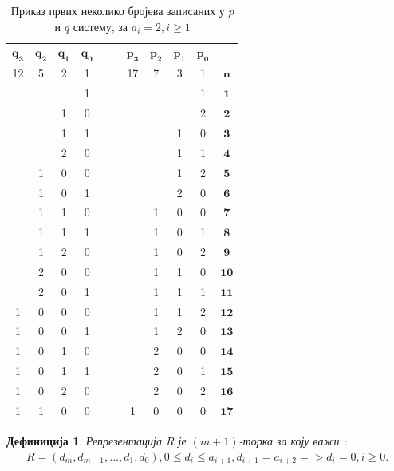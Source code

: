 \documentclass[a4paper]{article}
\newtheorem{definition}{Дефиниција}
\begin{document}
\begin{table}[h!]
	\caption{Приказ првих неколико бројева записаних у $ p $ и $ q $ систему, за $ a_{i} = 2 , i \ge 1 $}
	\label{tab:p_q_sistem}
	\begin{center}
		\begin{tabular}{ | c | c | c | c | c  c | c | c | c | c | c |}
			\hline
			{$ \mathbf{q_{3}} $} &  {$ \mathbf{q_{2}} $} &  {$ \mathbf{q_{1}} $} &  {$ \mathbf{q_{0}} $} & & &  {$ \mathbf{p_{3}} $} &  {$ \mathbf{p_{2}} $} &  {$ \mathbf{p_{1}} $} &  {$ \mathbf{p_{0}} $} &\\
			12 & 5 & 2 & 1 & & & 17 & 7 & 3 & 1 &  {$ \mathbf{n} $}\\
			\hline
			&  &  & 1 & & &  &  &  & 1 & {$ \mathbf{1} $}\\
			&  & 1 & 0 & & &  &  &  & 2 & {$ \mathbf{2} $}\\
			&  & 1 & 1 & & &  &  & 1 & 0 &  {$ \mathbf{3} $}\\
			&  & 2 & 0 & & &  &  & 1 & 1 &  {$ \mathbf{4} $}\\
			& 1 & 0 & 0 & & &  &  & 1 & 2 &  {$ \mathbf{5} $}\\
			& 1 & 0 & 1 & & &  &  & 2 & 0 &  {$ \mathbf{6} $}\\
			& 1 & 1 & 0 & & &  & 1 & 0 & 0 &  {$ \mathbf{7} $}\\
			& 1 & 1 & 1 & & &  & 1 & 0 & 1 &  {$ \mathbf{8} $}\\
			& 1 & 2 & 0 & & &  & 1 & 0 & 2 &  {$ \mathbf{9} $}\\
			& 2 & 0 & 0 & & &  & 1 & 1 & 0 &  {$ \mathbf{10} $}\\
			& 2 & 0 & 1 & & &  & 1 & 1 & 1 &  {$ \mathbf{11} $}\\
			 1 & 0 & 0 & 0 & & & & 1 & 1 & 2 &  {$ \mathbf{12} $}\\
			 1 & 0 & 0 & 1 & & & & 1 & 2 & 0 &  {$ \mathbf{13} $}\\
			 1 & 0 & 1 & 0 & & & & 2 & 0 & 0 &  {$ \mathbf{14} $}\\
			 1 & 0 & 1 & 1 & & & & 2 & 0 & 1 &  {$ \mathbf{15} $}\\
			 1 & 0 & 2 & 0 & & & & 2 & 0 & 2 &  {$ \mathbf{16} $}\\
			 1 & 1 & 0 & 0 & & & 1 & 0 & 0 & 0 &  {$ \mathbf{17} $}\\
			\hline 
		\end{tabular}
	\end{center}
\end{table}

\begin{definition}
	Репрезентација $ R $ је  $ (m+1) $-торка за коју важи :
	\begin{eqnarray}
		R = (d_{m}, d_{m-1}, ... , d_{1}, d_{0}), 0 \le d_{i} \le a_{i+1}, d_{i+1} = a_{i+2} => d_{i} = 0, i \ge 0.
	\end{eqnarray}
\end{definition}
\end{document}
